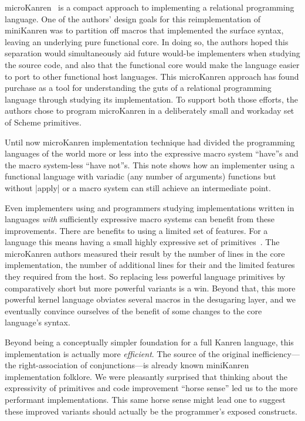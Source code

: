 \documentclass[sigplan,screen,draft,anonymous,review,natbib=false]{acmart}
\begin{document}
microKanren~\cite{hemann2013muKanren} is a compact approach to
implementing a relational programming language. One of the authors'
design goals for this reimplementation of miniKanren was to partition
off macros that implemented the surface syntax, leaving an underlying
pure functional core. In doing so, the authors hoped this separation
would simultaneously aid future would-be implementers when studying
the source code, and also that the functional core would make the
language easier to port to other functional host languages. This
microKanren approach has found purchase as a tool for understanding
the guts of a relational programming language through studying its
implementation. To support both those efforts, the authors chose to
program microKanren in a deliberately small and workaday set of Scheme
primitives.

Until now microKanren implementation technique had divided the
programming languages of the world more or less into the expressive
macro system \enquote{have}s and the macro system-less \enquote{have
  not}s. This note shows how an implementer using a functional
language with variadic (any number of arguments) functions but without
\rackinline|apply| or a macro system can still achieve an intermediate
point.

Even implementers using and programmers studying implementations
written in languages \emph{with} sufficiently expressive macro systems
can benefit from these improvements. There are benefits to using a
limited set of features. For a language this means having a small
highly expressive set of primitives~\cite{somedescriptionofscheme}.
The microKanren authors measured their result by the number of lines
in the core implementation, the number of additional lines for their
and the limited features they required from the host. So replacing
less powerful language primitives by comparatively short but more
powerful variants is a win. Beyond that, this more powerful kernel
language obviates several macros in the desugaring layer, and we
eventually convince ourselves of the benefit of some changes to the
core language's syntax.

Beyond being a conceptually simpler foundation for a full Kanren
language, this implementation is actually more \emph{efficient}. The
source of the original inefficiency---the right-association of
conjunctions---is already known miniKanren implementation folklore. We
were pleasantly surprised that thinking about the expressivity of
primitives and code improvement \enquote{horse sense} led us to the
more performant implementations. This same horse sense might lead one
to suggest these improved variants should actually be the programmer's
exposed constructs.
\end{document}

